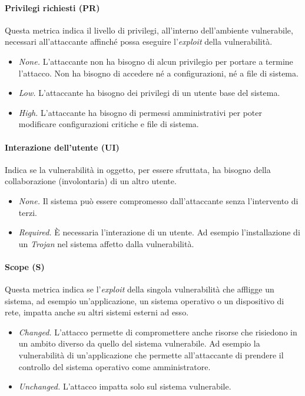 \documentclass[target=bach,aauheader=]{thud}
\begin{document}
\paragraph{Privilegi richiesti (PR)} Questa metrica indica il livello di privilegi, all'interno dell'ambiente vulnerabile, necessari all'attaccante affinché possa eseguire l'\textit{exploit} della vulnerabilità.

    \begin{itemize}
        \item \textit{None.} L'attaccante non ha bisogno di alcun privilegio per portare a termine l'attacco. Non ha bisogno di accedere né a configurazioni, né a file di sistema.
        \item \textit{Low.} L'attaccante ha bisogno dei privilegi di un utente base del sistema.
        \item \textit{High.} L'attaccante ha bisogno di permessi amministrativi per poter modificare configurazioni critiche e file di sistema.
    \end{itemize}

\paragraph{Interazione dell'utente (UI)} Indica se la vulnerabilità in oggetto, per essere sfruttata, ha bisogno della collaborazione (involontaria) di un altro utente.

    \begin{itemize}
        \item \textit{None.} Il sistema può essere compromesso dall'attaccante senza l'intervento di terzi.
        \item \textit{Required.} È necessaria l'interazione di un utente. Ad esempio l'installazione di un \textit{Trojan} nel sistema affetto dalla vulnerabilità.
    \end{itemize}

\paragraph{Scope (S)} Questa metrica indica se l'\textit{exploit} della singola vulnerabilità che affligge un sistema, ad esempio un'applicazione, un sistema operativo o un dispositivo di rete, impatta anche su altri sistemi esterni ad esso.

    \begin{itemize}
        \item \textit{Changed.} L'attacco permette di compromettere anche risorse che risiedono in un ambito diverso da quello del sistema vulnerabile. Ad esempio la vulnerabilità di un'applicazione che permette all'attaccante di prendere il controllo del sistema operativo come amministratore.
        \item \textit{Unchanged.} L'attacco impatta solo sul sistema vulnerabile.
    \end{itemize}
\end{document}
